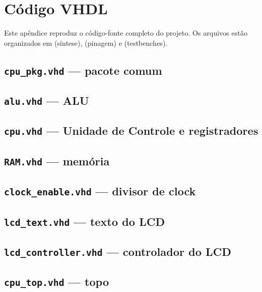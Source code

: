 \section{Código VHDL}
\label{ap:codigo}

Este apêndice reproduz o código-fonte completo do projeto. Os arquivos estão
organizados em  (síntese),  (pinagem) e
 (testbenches).

\lstset{style=vhdl, basicstyle=\ttfamily\scriptsize}

\subsection{\texttt{cpu\_pkg.vhd} --- pacote comum}


\subsection{\texttt{alu.vhd} --- ALU}


\subsection{\texttt{cpu.vhd} --- Unidade de Controle e registradores}


\subsection{\texttt{RAM.vhd} --- memória}


\subsection{\texttt{clock\_enable.vhd} --- divisor de clock}


\subsection{\texttt{lcd\_text.vhd} --- texto do LCD}


\subsection{\texttt{lcd\_controller.vhd} --- controlador do LCD}


\subsection{\texttt{cpu\_top.vhd} --- topo}


